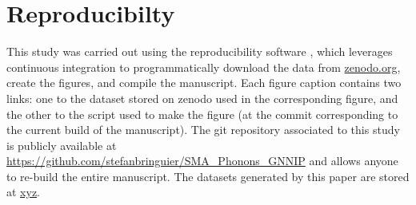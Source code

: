\documentclass[twocolumn]{aastex631}
\begin{document}
\appendix
\section{Reproducibilty}
This study was carried out using the reproducibility software \href{https://github.com/showyourwork/showyourwork}{\showyourwork} \citep{Luger2021}, which leverages continuous integration to programmatically download the data from \href{https://zenodo.org/}{zenodo.org}, create the figures, and compile the manuscript. Each figure caption contains two links: one to the dataset stored on zenodo used in the corresponding figure, and the other to the script used to make the figure (at the commit corresponding to the current build of the manuscript). The git repository associated to this study is publicly available at \url{https://github.com/stefanbringuier/SMA_Phonons_GNNIP} and allows anyone to re-build the entire manuscript. The datasets generated by this paper are stored at \url{xyz}.


\end{document}
